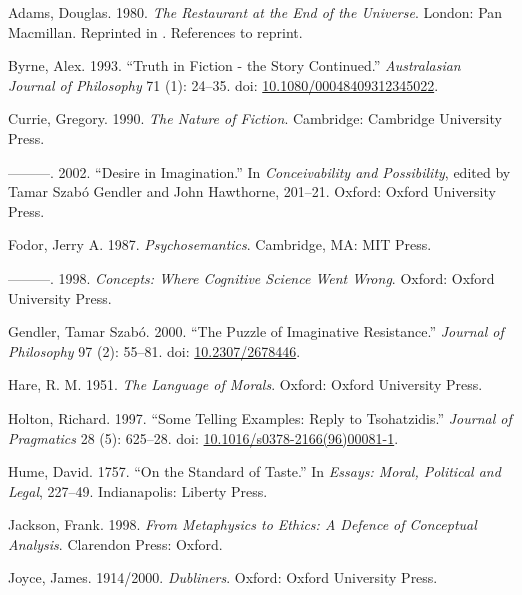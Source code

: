 \documentclass[
  11pt,
  letterpaper,
  DIV=11,
  numbers=noendperiod,
  twoside]{scrartcl}
\newlength{\cslhangindent}
\newenvironment{CSLReferences}[2] %
 {\begin{list}{}{%
  \setlength{\itemindent}{0pt}
  \setlength{\leftmargin}{0pt}
  \setlength{\parsep}{0pt}
  \ifodd #1
   \setlength{\leftmargin}{\cslhangindent}
   \setlength{\itemindent}{-1\cslhangindent}
  \fi
  \setlength{\itemsep}{#2\baselineskip}}}
 {\end{list}}
\begin{document}
\label{refs}
\begin{CSLReferences}{1}{0}
Adams, Douglas. 1980. \emph{The Restaurant at the End of the Universe}.
London: Pan Macmillan. Reprinted in \cite{Adams2002}. References to
reprint.

Byrne, Alex. 1993. {``Truth in Fiction - the Story Continued.''}
\emph{Australasian Journal of Philosophy} 71 (1): 24--35. doi:
\href{https://doi.org/10.1080/00048409312345022}{10.1080/00048409312345022}.

Currie, Gregory. 1990. \emph{The Nature of Fiction}. Cambridge:
Cambridge University Press.

---------. 2002. {``Desire in Imagination.''} In \emph{Conceivability
and Possibility}, edited by Tamar Szabó Gendler and John Hawthorne,
201--21. Oxford: Oxford University Press.

Fodor, Jerry A. 1987. \emph{Psychosemantics}. Cambridge, MA: MIT Press.

---------. 1998. \emph{Concepts: Where Cognitive Science Went Wrong}.
Oxford: Oxford University Press.

Gendler, Tamar Szabó. 2000. {``The Puzzle of Imaginative Resistance.''}
\emph{Journal of Philosophy} 97 (2): 55--81. doi:
\href{https://doi.org/10.2307/2678446}{10.2307/2678446}.

Hare, R. M. 1951. \emph{The Language of Morals}. Oxford: Oxford
University Press.

Holton, Richard. 1997. {``Some Telling Examples: Reply to
Tsohatzidis.''} \emph{Journal of Pragmatics} 28 (5): 625--28. doi:
\href{https://doi.org/10.1016/s0378-2166(96)00081-1}{10.1016/s0378-2166(96)00081-1}.

Hume, David. 1757. {``On the Standard of Taste.''} In \emph{Essays:
Moral, Political and Legal}, 227--49. Indianapolis: Liberty Press.

Jackson, Frank. 1998. \emph{From Metaphysics to Ethics: A Defence of
Conceptual Analysis}. Clarendon Press: Oxford.

Joyce, James. 1914/2000. \emph{Dubliners}. Oxford: Oxford University
Press.


\end{CSLReferences}
\end{document}
